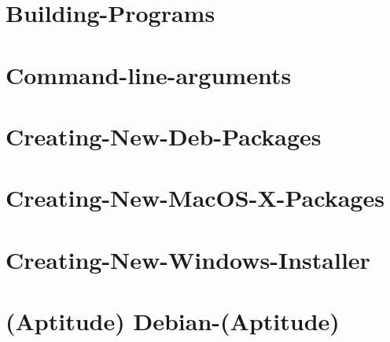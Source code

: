 \let\mypdfximage\pdfximage\def\pdfximage{\immediate\mypdfximage}\documentclass[twoside]{book}
\newcommand{\+}{\discretionary{\mbox{\scriptsize$\hookleftarrow$}}{}{}}
\begin{document}
\chapter{Building-\/\+Programs}
\label{md__home_rvree__t_s_g_l_2_81__t_s_g_l__t_s_g_l_8wiki__building-_programs}

\chapter{Command-\/line-\/arguments}
\label{md__home_rvree__t_s_g_l_2_81__t_s_g_l__t_s_g_l_8wiki__command-line-arguments}

\chapter{Creating-\/\+New-\/\+Deb-\/\+Packages}
\label{md__home_rvree__t_s_g_l_2_81__t_s_g_l__t_s_g_l_8wiki__creating-_new-_deb-_packages}

\chapter{Creating-\/\+New-\/\+Mac\+O\+S-\/\+X-\/\+Packages}
\label{md__home_rvree__t_s_g_l_2_81__t_s_g_l__t_s_g_l_8wiki__creating-_new-_mac_o_s-_x-_packages}

\chapter{Creating-\/\+New-\/\+Windows-\/\+Installer}
\label{md__home_rvree__t_s_g_l_2_81__t_s_g_l__t_s_g_l_8wiki__creating-_new-_windows-_installer}

\chapter{(Aptitude) Debian-\/(Aptitude)}
\label{md__home_rvree__t_s_g_l_2_81__t_s_g_l__t_s_g_l_8wiki__debian-}

\end{document}
